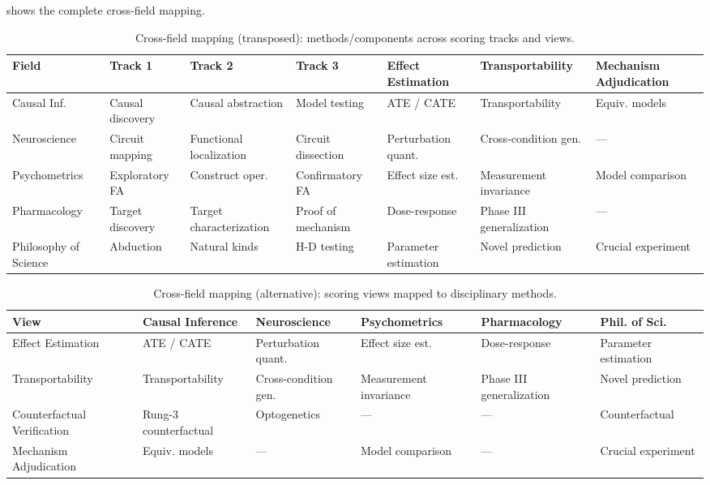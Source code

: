 \documentclass[10pt]{article}
\begin{document}
 shows the complete cross-field mapping.

\begin{table}[t]
\centering
\small
\renewcommand{\arraystretch}{1.1}
\caption{Cross-field mapping (transposed): methods/components across scoring tracks and views.}
\label{tab:crossfield_transposed}
\renewcommand{\arraystretch}{1.12}
\begin{tabular}{|l|p{1.6cm}|p{1.6cm}|p{1.6cm}|p{1.6cm}|p{1.6cm}|p{1.6cm}|}
\hline
\textbf{Field} & \textbf{Track 1} & \textbf{Track 2} & \textbf{Track 3} & \textbf{Effect Estimation} & \textbf{Transportability} & \textbf{Mechanism Adjudication} \\
\hline
Causal Inf. & Causal discovery & Causal abstraction & Model testing & ATE / CATE & Transportability & Equiv. models \\
\hline
Neuroscience & Circuit mapping & Functional localization & Circuit dissection & Perturbation quant. & Cross-condition gen. & --- \\
\hline
Psychometrics & Exploratory FA & Construct oper. & Confirmatory FA & Effect size est. & Measurement invariance & Model comparison \\
\hline
Pharmacology & Target discovery & Target characterization & Proof of mechanism & Dose-response & Phase III generalization & --- \\
\hline
Philosophy of Science & Abduction & Natural kinds & H-D testing & Parameter estimation & Novel prediction & Crucial experiment \\
\hline
\end{tabular}
\end{table}

\begin{table}[t]
\centering
\small
\renewcommand{\arraystretch}{1.08}
\caption{Cross-field mapping (alternative): scoring views mapped to disciplinary methods.}
\label{tab:crossfield_alt}
\begin{tabular}{|p{2.2cm}|p{2.2cm}|p{2.2cm}|p{2.2cm}|p{2.2cm}|p{2.2cm}|}
\hline
\textbf{View} & \textbf{Causal Inference} & \textbf{Neuroscience} & \textbf{Psychometrics} & \textbf{Pharmacology} & \textbf{Phil. of Sci.} \\
\hline
Effect Estimation & ATE / CATE & Perturbation quant. & Effect size est. & Dose-response & Parameter estimation \\
\hline
Transportability & Transportability & Cross-condition gen. & Measurement invariance & Phase III generalization & Novel prediction \\
\hline
Counterfactual Verification & Rung-3 counterfactual & Optogenetics & --- & --- & Counterfactual \\
\hline
Mechanism Adjudication & Equiv. models & --- & Model comparison & --- & Crucial experiment \\
\hline
\end{tabular}
\end{table}
\end{document}
